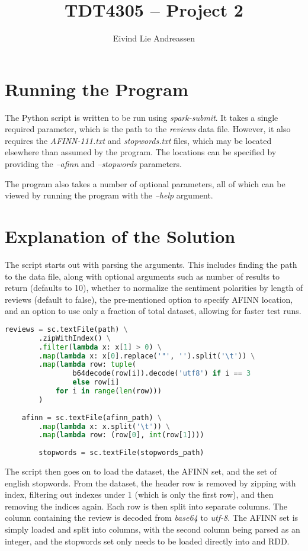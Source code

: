 \documentclass[a4paper]{article}
\title{TDT4305 -- Project 2}
\author{Eivind Lie Andreassen}
\begin{document}
\maketitle

\section{Running the Program}
The Python script is written to be run using \emph{spark-submit}. It takes a single required parameter, which is the path to the \emph{reviews} data file. However, it also requires the \emph{AFINN-111.txt} and \emph{stopwords.txt} files, which may be located elsewhere than assumed by the program. The locations can be specified by providing the \emph{--afinn} and \emph{--stopwords} parameters.

The program also takes a number of optional parameters, all of which can be viewed by running the program with the \emph{--help} argument.


\section{Explanation of the Solution}
The script starts out with parsing the arguments. This includes finding the path to the data file, along with optional arguments such as number of results to return (defaults to 10), whether to normalize the sentiment polarities by length of reviews (default to false), the pre-mentioned option to specify AFINN location, and an option to use only a fraction of total dataset, allowing for faster test runs.

\begin{lstlisting}[language=python]
    reviews = sc.textFile(path) \
        .zipWithIndex() \
        .filter(lambda x: x[1] > 0) \
        .map(lambda x: x[0].replace('"', '').split('\t')) \
        .map(lambda row: tuple(
                b64decode(row[i]).decode('utf8') if i == 3 
                else row[i] 
            for i in range(len(row)))
        )
    
    afinn = sc.textFile(afinn_path) \
        .map(lambda x: x.split('\t')) \
        .map(lambda row: (row[0], int(row[1])))
    
        stopwords = sc.textFile(stopwords_path)
\end{lstlisting}

The script then goes on to load the dataset, the AFINN set, and the set of english stopwords. From the dataset, the header row is removed by zipping with index, filtering out indexes under 1 (which is only the first row), and then removing the indices again. Each row is then split into separate columns. The column containing the review is decoded from \emph{base64} to \emph{utf-8}. The AFINN set is simply loaded and split into columns, with the second column being parsed as an integer, and the stopwords set only needs to be loaded directly into and RDD.
\end{document}
